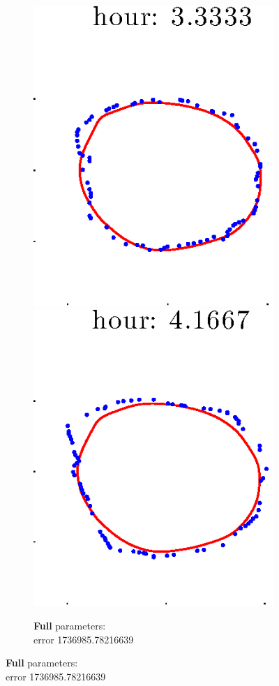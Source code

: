 \documentclass[12pt]{article}
\begin{document}
\begin{figure}[h!]
\begin{subfigure}[b]{.3\textwidth}
		\includegraphics[height=.15\textheight]{Pos10exp2/secondhalf/full5.eps}
		\includegraphics[height=.15\textheight]{Pos10exp2/secondhalf/full6.eps}
		\caption{\textbf{Full} parameters: \\error 1736985.78216639}

\end{subfigure}
\end{figure}
\end{document}
